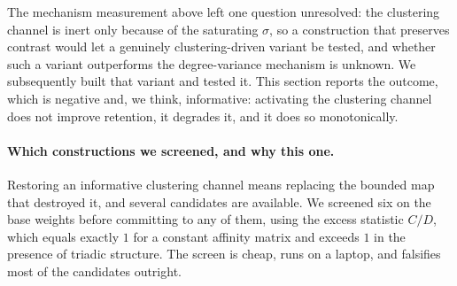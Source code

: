 \documentclass[11pt,a4paper]{article}
\begin{document}
The mechanism measurement above left one question unresolved: the clustering
channel is inert only because of the saturating
$\sigma$, so a construction that preserves contrast would let a genuinely
clustering-driven variant be tested, and whether such a variant outperforms
the degree-variance mechanism is unknown. We subsequently built that variant
and tested it. This section reports the outcome, which is negative and, we
think, informative: activating the clustering channel does not improve
retention, it degrades it, and it does so monotonically.

\paragraph{Which constructions we screened, and why this one.} Restoring an
informative clustering channel means replacing the bounded map that destroyed
it, and several candidates are available. We screened six on the base weights
before committing to any of them, using the excess statistic $C/D$, which
equals exactly $1$ for a constant affinity matrix and exceeds $1$ in the
presence of triadic structure. The screen is cheap, runs on a laptop, and
falsifies most of the candidates outright.
\end{document}
